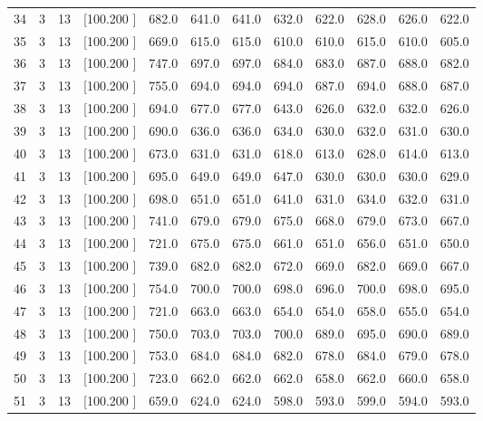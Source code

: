 \documentclass[12pt,a4paper]{article}
\begin{document}
\begin{center}
{\begin{tabular}{r r r r r r r r r r r r}
  34&  3& 13&[100.200   ]&   682.0&   641.0&   641.0&   632.0&   622.0&   628.0&   626.0&   622.0\\[-0.02in]
  35&  3& 13&[100.200   ]&   669.0&   615.0&   615.0&   610.0&   610.0&   615.0&   610.0&   605.0\\[-0.02in]
  36&  3& 13&[100.200   ]&   747.0&   697.0&   697.0&   684.0&   683.0&   687.0&   688.0&   682.0\\[-0.02in]
  37&  3& 13&[100.200   ]&   755.0&   694.0&   694.0&   694.0&   687.0&   694.0&   688.0&   687.0\\[-0.02in]
  38&  3& 13&[100.200   ]&   694.0&   677.0&   677.0&   643.0&   626.0&   632.0&   632.0&   626.0\\[-0.02in]
  39&  3& 13&[100.200   ]&   690.0&   636.0&   636.0&   634.0&   630.0&   632.0&   631.0&   630.0\\[-0.02in]
  40&  3& 13&[100.200   ]&   673.0&   631.0&   631.0&   618.0&   613.0&   628.0&   614.0&   613.0\\[-0.02in]
  41&  3& 13&[100.200   ]&   695.0&   649.0&   649.0&   647.0&   630.0&   630.0&   630.0&   629.0\\[-0.02in]
  42&  3& 13&[100.200   ]&   698.0&   651.0&   651.0&   641.0&   631.0&   634.0&   632.0&   631.0\\[-0.02in]
  43&  3& 13&[100.200   ]&   741.0&   679.0&   679.0&   675.0&   668.0&   679.0&   673.0&   667.0\\[-0.02in]
  44&  3& 13&[100.200   ]&   721.0&   675.0&   675.0&   661.0&   651.0&   656.0&   651.0&   650.0\\[-0.02in]
  45&  3& 13&[100.200   ]&   739.0&   682.0&   682.0&   672.0&   669.0&   682.0&   669.0&   667.0\\[-0.02in]
  46&  3& 13&[100.200   ]&   754.0&   700.0&   700.0&   698.0&   696.0&   700.0&   698.0&   695.0\\[-0.02in]
  47&  3& 13&[100.200   ]&   721.0&   663.0&   663.0&   654.0&   654.0&   658.0&   655.0&   654.0\\[-0.02in]
  48&  3& 13&[100.200   ]&   750.0&   703.0&   703.0&   700.0&   689.0&   695.0&   690.0&   689.0\\[-0.02in]
  49&  3& 13&[100.200   ]&   753.0&   684.0&   684.0&   682.0&   678.0&   684.0&   679.0&   678.0\\[-0.02in]
  50&  3& 13&[100.200   ]&   723.0&   662.0&   662.0&   662.0&   658.0&   662.0&   660.0&   658.0\\[-0.02in]
  51&  3& 13&[100.200   ]&   659.0&   624.0&   624.0&   598.0&   593.0&   599.0&   594.0&   593.0\\[-0.02in]

\end{tabular}}
\end{center}
\end{document}

